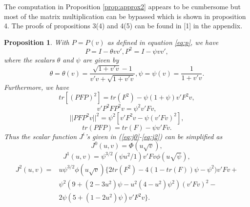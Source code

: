 \documentclass[a4paper]{article}
\newtheorem{prop}{Proposition}
\begin{document}
The computation in Proposition \ref{prop:approx2} appears to be cumbersome but most of the matrix multiplication can be bypassed which is shown in proposition 4. The proofs of propositions 3(4) and 4(5) can be found in [1] in the appendix. 

\begin{prop}
\label{prop:app2short}
With $P = P(v)$ as defined in equation \ref{eq:p}, we have
$$P=I-\theta vv', P^2=I-\psi vv',$$
where the scalars $\theta$ and $\psi$ are given by
$$\theta=\theta(v)=\frac{\sqrt{1+v'v}-1}{v'v+\sqrt{1+v'v}},\psi=\psi(v)=\frac{1}{1+v'v}.$$
Furthermore, we have
$$tr[(PFP)^2]=tr(F^2)-\psi(1+\psi)v'F^2v,$$
$$v'P^2FP^2v=\psi^2v'Fv,$$
$$||PFP^2v||^2=\psi^2[v'F^2v-\psi(v'Fv)^2],$$
$$tr(PFP)=tr(F)-\psi v'Fv.$$
Thus the scalar function $J^i$'s given in (\ref{eq:j0}-\ref{eq:j2}) can be simplified as
\begin{equation}
J^0(u,v)=\Phi(u\sqrt{v}),
\end{equation}
\begin{equation}
J^1(u,v)=\psi^{3/2}(\psi u^2/1)v'Fv\phi(u\sqrt{\psi}),
\end{equation}
\begin{equation}
\begin{split}
J^2(u,v)=&u\psi^{3/2}\phi(u\sqrt{v})\big\{2tr(F^2) - 4(1-tr(F))\psi-\psi^2)v'Fv+ \\
	& \psi^2(9+(2-3u^2)\psi-u^2(4-u^2)\psi^2)(v'Fv)^2-\\
	&2\psi(5+(1-2u^2)\psi)v'F^2v\big\}.
\end{split}
\end{equation}
\end{prop}

\newpage
\end{document}
